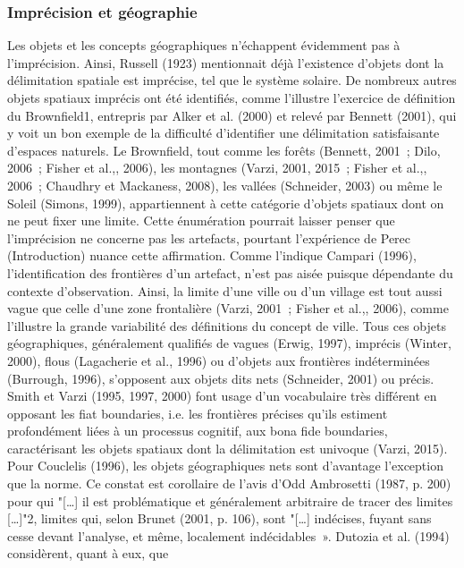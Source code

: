 \subsubsection{Imprécision et géographie}

Les objets et les concepts géographiques n’échappent évidemment pas à
l’imprécision. Ainsi, Russell (1923) mentionnait déjà l’existence
d’objets dont la délimitation spatiale est imprécise, tel que le
système solaire. De nombreux autres objets spatiaux imprécis ont été
identifiés, comme l’illustre l’exercice de définition du Brownfield1,
entrepris par Alker et al. (2000) et relevé par Bennett (2001), qui y
voit un bon exemple de la difficulté d’identifier une délimitation
satisfaisante d’espaces naturels. Le Brownfield, tout comme les forêts
(Bennett, 2001 ; Dilo, 2006 ; Fisher et al.,, 2006), les montagnes
(Varzi, 2001, 2015 ; Fisher et al.,, 2006 ; Chaudhry et Mackaness,
2008), les vallées (Schneider, 2003) ou même le Soleil (Simons, 1999),
appartiennent à cette catégorie d’objets spatiaux dont on ne peut
fixer une limite. Cette énumération pourrait laisser penser que
l’imprécision ne concerne pas les artefacts, pourtant l’expérience de
Perec (Introduction) nuance cette affirmation. Comme l’indique Campari
(1996), l’identification des frontières d’un artefact, n’est pas aisée
puisque dépendante du contexte d’observation. Ainsi, la limite d’une
ville ou d’un village est tout aussi vague que celle d’une zone
frontalière (Varzi, 2001 ; Fisher et al.,, 2006), comme l’illustre la
grande variabilité des définitions du concept de ville.  Tous ces
objets géographiques, généralement qualifiés de vagues (Erwig, 1997),
imprécis (Winter, 2000), flous (Lagacherie et al., 1996) ou d’objets
aux frontières indéterminées (Burrough, 1996), s’opposent aux objets
dits nets (Schneider, 2001) ou précis. Smith et Varzi (1995, 1997,
2000) font usage d’un vocabulaire très différent en opposant les fiat
boundaries, i.e. les frontières précises qu’ils estiment profondément
liées à un processus cognitif, aux bona fide boundaries, caractérisant
les objets spatiaux dont la délimitation est univoque (Varzi,
2015). Pour Couclelis (1996), les objets géographiques nets sont
d’avantage l’exception que la norme. Ce constat est corollaire de
l’avis d’Odd Ambrosetti (1987, p. 200) pour qui "[…] il est
problématique et généralement arbitraire de tracer des limites […]"2,
limites qui, selon Brunet (2001, p. 106), sont "[…] indécises, fuyant
sans cesse devant l’analyse, et même, localement
indécidables ». Dutozia et al. (1994) considèrent, quant à eux, que
